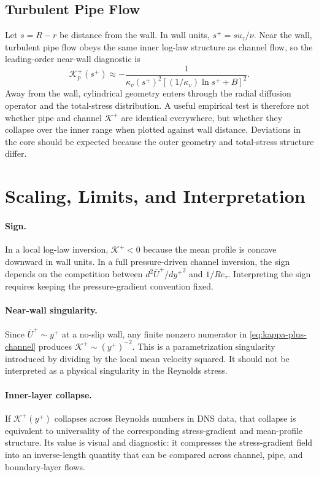 \documentclass[11pt]{article}
\newcommand{\Ut}{\overline{U}}
\newcommand{\Ret}{Re_\tau}
\newcommand{\kapg}{\mathcal{K}}
\newcommand{\kapv}{\kappa_v}
\begin{document}
\subsection{Turbulent Pipe Flow}

Let $s=R-r$ be distance from the wall. In wall units, $s^+=su_\tau/\nu$. Near the wall, turbulent pipe flow obeys the same inner log-law structure as channel flow, so the leading-order near-wall diagnostic is
\begin{equation}
\kapg_p^+(s^+)\approx
-\frac{1}{\kapv (s^+)^2\left[(1/\kapv)\ln s^+ + B\right]^2}.
\end{equation}
Away from the wall, cylindrical geometry enters through the radial diffusion operator and the total-stress distribution. A useful empirical test is therefore not whether pipe and channel $\kapg^+$ are identical everywhere, but whether they collapse over the inner range when plotted against wall distance. Deviations in the core should be expected because the outer geometry and total-stress structure differ.

\section{Scaling, Limits, and Interpretation}

\paragraph{Sign.} In a local log-law inversion, $\kapg^+<0$ because the mean profile is concave downward in wall units. In a full pressure-driven channel inversion, the sign depends on the competition between $d^2\Ut^+/d{y^+}^2$ and $1/\Ret$. Interpreting the sign requires keeping the pressure-gradient convention fixed.

\paragraph{Near-wall singularity.} Since $\Ut^+\sim y^+$ at a no-slip wall, any finite nonzero numerator in \eqref{eq:kappa-plus-channel} produces $\kapg^+\sim (y^+)^{-2}$. This is a parametrization singularity introduced by dividing by the local mean velocity squared. It should not be interpreted as a physical singularity in the Reynolds stress.

\paragraph{Inner-layer collapse.} If $\kapg^+(y^+)$ collapses across Reynolds numbers in DNS data, that collapse is equivalent to universality of the corresponding stress-gradient and mean-profile structure. Its value is visual and diagnostic: it compresses the stress-gradient field into an inverse-length quantity that can be compared across channel, pipe, and boundary-layer flows.
\end{document}
